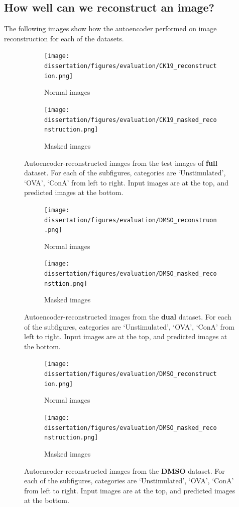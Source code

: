 \subsection{How well can we reconstruct an image?}

The following images show how the autoencoder performed on image reconstruction for each of the datasets.

\begin{figure}[h!]
    \centering
    \begin{subfigure}[h!]{0.45\textwidth}
        \texttt{[image: dissertation/figures/evaluation/CK19\_reconstruction.png]}
        \caption{Normal images}
    \end{subfigure}
    \begin{subfigure}[h!]{0.45\textwidth}
        \texttt{[image: dissertation/figures/evaluation/CK19\_masked\_reconstruction.png]}
        \caption{Masked images}
    \end{subfigure}
    \caption{Autoencoder-reconstructed images from the test images of \textbf{full} dataset. For each of the subfigures, categories are `Unstimulated', `OVA', `ConA' from left to right. Input images are at the top, and predicted images at the bottom.}
    \label{fig:my_label}
\end{figure}

\begin{figure}[h!]
    \centering
    \begin{subfigure}[h!]{0.45\textwidth}
        \texttt{[image: dissertation/figures/evaluation/DMSO\_reconstruon.png]}
        \caption{Normal images}
    \end{subfigure}
    \begin{subfigure}[h!]{0.45\textwidth}
        \texttt{[image: dissertation/figures/evaluation/DMSO\_masked\_reconsttion.png]}
        \caption{Masked images}
    \end{subfigure}
    \caption{Autoencoder-reconstructed images from the \textbf{dual} dataset. For each of the subfigures, categories are `Unstimulated', `OVA', `ConA' from left to right. Input images are at the top, and predicted images at the bottom.}
    \label{fig:my_label}
\end{figure}

\begin{figure}[h!]
    \centering
    \begin{subfigure}[h!]{0.45\textwidth}
        \texttt{[image: dissertation/figures/evaluation/DMSO\_reconstruction.png]}
        \caption{Normal images}
    \end{subfigure}
    \begin{subfigure}[h!]{0.45\textwidth}
        \texttt{[image: dissertation/figures/evaluation/DMSO\_masked\_reconstruction.png]}
        \caption{Masked images}
    \end{subfigure}
    \caption{Autoencoder-reconstructed images from the \textbf{DMSO} dataset. For each of the subfigures, categories are `Unstimulated', `OVA', `ConA' from left to right. Input images are at the top, and predicted images at the bottom.}
    \label{fig:my_label}
\end{figure}

